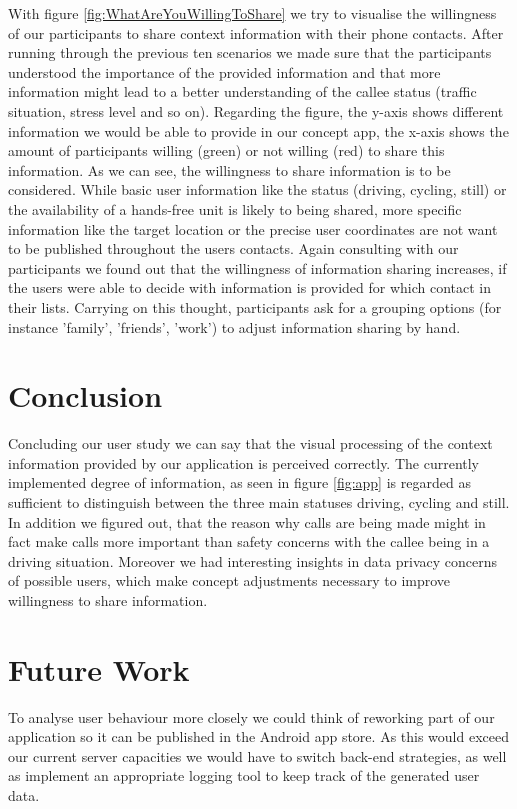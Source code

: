 \documentclass{sigchi}
\begin{document}
With figure \ref{fig:WhatAreYouWillingToShare} we try to visualise the willingness of our participants to share context information with their phone contacts. After running through the previous ten scenarios we made sure that the participants understood the importance of the provided information and that more information might lead to a better understanding of the callee status (traffic situation, stress level and so on). Regarding the figure, the y-axis shows different information we would be able to provide in our concept app, the x-axis shows the amount of participants willing (green) or not willing (red) to share this information. As we can see, the willingness to share information is to be considered. While basic user information like the status (driving, cycling, still) or the availability of a hands-free unit is likely to being shared, more specific information like the target location or the precise user coordinates are not want to be published throughout the users contacts. Again consulting with our participants we found out that the willingness of information sharing increases, if the users were able to decide with information is provided for which contact in their lists. Carrying on this thought, participants ask for a grouping options (for instance 'family', 'friends', 'work') to adjust information sharing by hand.


\section{Conclusion}
Concluding our user study we can say that the visual processing of the context information provided by our application is perceived correctly. The currently implemented degree of information, as seen in figure \ref{fig:app} is regarded as sufficient to distinguish between the three main statuses driving, cycling and still. In addition we figured out, that the reason why calls are being made might in fact make calls more important than safety concerns with the callee being in a driving situation. Moreover we had interesting insights in data privacy concerns of possible users, which make concept adjustments necessary to improve willingness to share information.

\section{Future Work}
To analyse user behaviour more closely we could think of reworking part of our application so it can be published in the Android app store. As this would exceed our current server capacities we would have to switch back-end strategies, as well as implement an appropriate logging tool to keep track of the generated user data.

\balance{}


\balance{}



\end{document}
